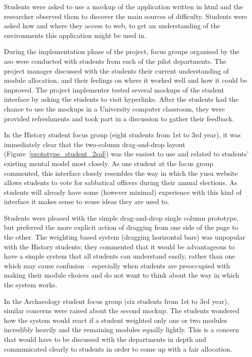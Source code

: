 \documentclass[draft]{scrartcl}
\begin{document}
Students were asked to use a mockup of the application written in \gls{html}
and the researcher observed them to discover the main sources of difficulty.
Students were asked how and where they access to web, to get an understanding
of the environments this application might be used in.

During the implementation phase of the project, focus groups organised by the
\gls{aso} were conducted with students from each of the pilot departments. The
project manager discussed with the students their current understanding of
module allocation, and their feelings on where it worked well and how it could
be improved. The project implementer tested several mockups of the student
interface by asking the students to visit hyperlinks. After the students had
the chance to use the mockups in a University computer classroom, they were
provided refreshments and took part in a discussion to gather their feedback.

In the History student focus group (eight students from 1st to 3rd year), it
was immediately clear that the two-column drag-and-drop layout
(Figure~\ref{prototype_student_2col}) was the easiest to use and related to
students' existing mental model most closely. As one student at the focus
group commented, this interface closely resembles the way in which the
\gls{yusu} website allows students to vote for sabbatical officers during
their annual elections. As students will already have some (however minimal)
experience with this kind of interface it makes sense to reuse ideas they are
used to.

Students were pleased with the simple drag-and-drop single column prototype,
but preferred the more explicit action of dragging from one side of the page
to the other. The weighting based system (dragging horizontal bars) was
unpopular with the History students; they commented that it would be
advantageous to have a simple system that all students can understand easily,
rather than one which may cause confusion -- especially when students are
preoccupied with making their module choices and do not want to think about
the way in which the system works.

In the Archaeology student focus group (six students from 1st to 3rd year),
similar concerns were raised about the second mockup. The students wondered
how the system would react if a student weighted only one or two modules
incredibly heavily and the remaining modules equally lightly. This is a
concern that would have to be discussed with the departments in depth and
communicated clearly to students in order to come up with a fair allocation.
\end{document}
